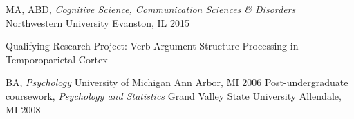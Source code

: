 
\begin{cventries}

  \cventry
    {MA, ABD, \textit{Cognitive Science, Communication Sciences \& Disorders}} %
    {Northwestern University} %
    {Evanston, IL} %
    {2015} %
    {
      \begin{cvitems} %
        \item {Qualifying Research Project: Verb Argument Structure Processing in Temporoparietal Cortex}
      \end{cvitems}
    }

  \cventry
    {BA, \textit{Psychology}} %
    {University of Michigan} %
    {Ann Arbor, MI} %
    {2006} %
    {}
 \cventry
    {Post-undergraduate coursework, \textit{Psychology and Statistics}} %
    {Grand Valley State University} %
    {Allendale, MI} %
    {2008} %
    {}

\end{cventries}


